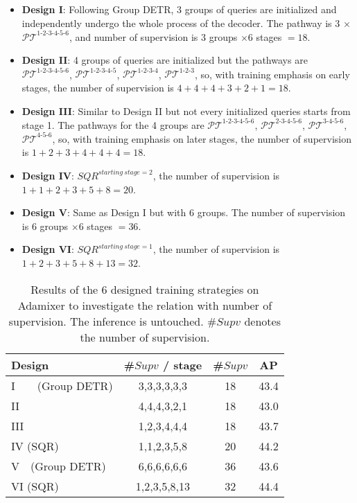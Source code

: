 \documentclass[10pt,twocolumn,letterpaper]{article}
\begin{document}
\begin{itemize}
    \item \textbf{Design I}: Following Group DETR, 3 groups of queries are initialized and independently undergo the whole process of the decoder. The pathway is 3 $\times$ $\mathcal{PT}^{1\text{-}2\text{-}3\text{-}4\text{-}5\text{-}6}$, and number of supervision is $ 3 $ groups $\times 6$ stages $= 18$.
    \item \textbf{Design II}: 4 groups of queries are initialized but the pathways are
    $\mathcal{PT}^{1\text{-}2\text{-}3\text{-}4\text{-}5\text{-}6}$, 
    $\mathcal{PT}^{1\text{-}2\text{-}3\text{-}4\text{-}5}$, 
    $\mathcal{PT}^{1\text{-}2\text{-}3\text{-}4}$, 
    $\mathcal{PT}^{1\text{-}2\text{-}3}$, so, with training emphasis on early stages, the number of supervision is $4+4+4+3+2+1=18$.
    \item \textbf{Design III}: Similar to Design II but not every initialized queries starts from stage 1. The pathways for the 4 groups are $\mathcal{PT}^{1\text{-}2\text{-}3\text{-}4\text{-}5\text{-}6}$,
    $\mathcal{PT}^{2\text{-}3\text{-}4\text{-}5\text{-}6}$, 
    $\mathcal{PT}^{3\text{-}4\text{-}5\text{-}6}$,
    $\mathcal{PT}^{4\text{-}5\text{-}6}$, so, with training emphasis on later stages, the number of supervision is $1+2+3+4+4+4=18$.
    \item \textbf{Design IV}: $SQR^{starting~stage = 2}$, the number of supervision is $1+1+2+3+5+8=20$.
    \item \textbf{Design V}: Same as Design I but with 6 groups. The number of supervision is $ 6 $ groups $\times 6$ stages $= 36$.
    \item \textbf{Design VI}: $SQR^{starting~stage = 1}$, the number of supervision is $1+2+3+5+8+13=32$.
\end{itemize}

\begin{table}[t!]
\centering
    \begin{tabular}{l|c|c|c}
    \toprule[1pt]
        Design &  \#$Supv$ / stage & \#$Supv$ & AP \\ \midrule
        I~~~~(Group DETR) & 3,3,3,3,3,3 & 18 & 43.4 \\ 
        II & 4,4,4,3,2,1 & 18 & 43.0 \\ 
        III & 1,2,3,4,4,4 & 18 & 43.7 \\ 
        IV (SQR) & 1,1,2,3,5,8 & 20 & 44.2 \\ 
        \midrule
        V~~(Group DETR) & 6,6,6,6,6,6 & 36 & 43.6 \\ 
        VI (SQR)& 1,2,3,5,8,13& 32 & 44.4 \\ 
       \bottomrule
    \end{tabular}
    \caption{Results of the 6 designed training strategies on Adamixer to investigate the relation with number of supervision. The inference is untouched. \#$Supv$ denotes the number of supervision.}
    \label{tab:num_supervision}
\end{table}
\end{document}
